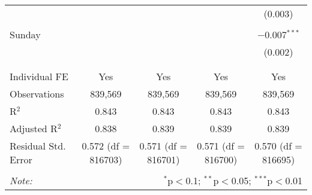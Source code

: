 \documentclass[
]{article}
\begin{document}
\begin{table}[!htbp]
{\begin{tabular}{@{\extracolsep{5pt}}lcccc}
  &  &  &  & (0.003) \\ 
  & & & & \\ 
 Sunday &  &  &  & $-$0.007$^{***}$ \\ 
  &  &  &  & (0.002) \\ 
  & & & & \\ 
\hline \\[-1.8ex] 
Individual FE & Yes & Yes & Yes & Yes \\ 
Observations & 839,569 & 839,569 & 839,569 & 839,569 \\ 
R$^{2}$ & 0.843 & 0.843 & 0.843 & 0.843 \\ 
Adjusted R$^{2}$ & 0.838 & 0.839 & 0.839 & 0.839 \\ 
Residual Std. Error & 0.572 (df = 816703) & 0.571 (df = 816701) & 0.571 (df = 816700) & 0.570 (df = 816695) \\ 
\hline 
\hline \\[-1.8ex] 
\textit{Note:}  & \multicolumn{4}{r}{$^{*}$p$<$0.1; $^{**}$p$<$0.05; $^{***}$p$<$0.01} \\ 
\end{tabular}
} 
\end{table} 
\newpage
\end{document}
